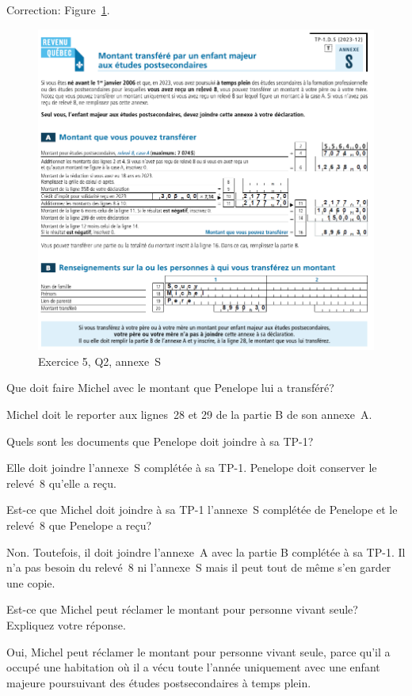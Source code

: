 Correction: Figure~\ref{fig:chap4Exercice5Q2AnnexeS}.
\begin{figure}
	\centering
	\includegraphics[width=.9\textwidth]{exercice/4-5/Q2/Annexe-S.png}
	\caption[]{Exercice 5, Q2, annexe~S}
	\label{fig:chap4Exercice5Q2AnnexeS}
\end{figure}

\begin{sousQuestion}
	Que doit faire Michel avec le montant que Penelope lui a transféré?
\end{sousQuestion}
Michel doit le reporter aux lignes~28 et 29 de la partie B de son annexe~A.

\begin{sousQuestion}
	Quels sont les documents que Penelope doit joindre à sa TP-1?
\end{sousQuestion}
Elle doit joindre l'annexe~S complétée à sa TP-1. Penelope doit conserver le relevé~8 qu'elle a reçu.

\begin{sousQuestion}
	Est-ce que Michel doit joindre à sa TP-1 l'annexe~S complétée de Penelope et le relevé~8 que Penelope a reçu?
\end{sousQuestion}
Non. Toutefois, il doit joindre l'annexe~A avec la partie B complétée à sa TP-1. Il n'a pas besoin du relevé~8  ni l'annexe~S mais il peut tout de même s'en garder une copie.

\begin{sousQuestion}
	Est-ce que Michel peut réclamer le montant pour personne vivant seule? Expliquez votre réponse.
\end{sousQuestion}
Oui, Michel peut réclamer le montant pour personne vivant seule, parce qu'il a occupé une habitation où il a vécu toute l'année uniquement avec une enfant majeure poursuivant des études postsecondaires à temps plein.


